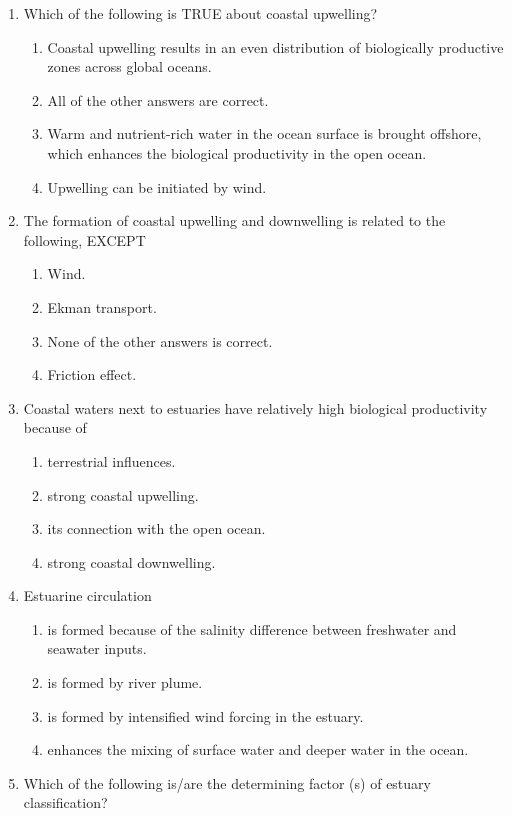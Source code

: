 \documentclass{report}
\begin{document}
\begin{enumerate}
    \item Which of the following is TRUE about coastal upwelling?
    \begin{enumerate}
        \item   Coastal upwelling results in an even distribution of biologically productive zones across global oceans.
        \item   All of the other answers are correct. 
        \item   Warm and nutrient-rich water in the ocean surface is brought offshore, which enhances the biological productivity in the open ocean.
        \item   Upwelling can be initiated by wind. 
    \end{enumerate}
    \item The formation of coastal upwelling and downwelling is related  to the following,  EXCEPT
    \begin{enumerate}
        \item   Wind. 
        \item   Ekman transport. 
        \item   None of the other answers is correct. 
        \item   Friction effect. 
    \end{enumerate}
    \item Coastal waters next to estuaries have relatively high biological productivity because of
    \begin{enumerate}
        \item   terrestrial influences. 
        \item   strong coastal upwelling. 
        \item   its connection with the open ocean. 
        \item   strong coastal downwelling. 
    \end{enumerate}
    \item Estuarine circulation
    \begin{enumerate}
        \item   is formed because of the salinity difference between freshwater and seawater inputs.
        \item   is formed by river plume. 
        \item   is formed by intensified wind forcing in the estuary. 
        \item   enhances the mixing of surface water and deeper water in the ocean. 
    \end{enumerate}
    \item Which of the following is/are the determining factor (s) of estuary classification?

\end{enumerate}
\end{document}
